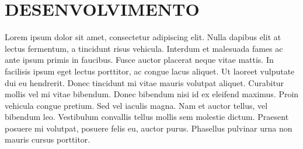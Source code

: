 \chapter{DESENVOLVIMENTO}
\label{chap:desenvolvimento}

Lorem ipsum dolor sit amet, consectetur adipiscing elit. Nulla dapibus elit at lectus fermentum, a tincidunt risus vehicula. Interdum et malesuada fames ac ante ipsum primis in faucibus. Fusce auctor placerat neque vitae mattis. In facilisis ipsum eget lectus porttitor, ac congue lacus aliquet. Ut laoreet vulputate dui eu hendrerit. Donec tincidunt mi vitae mauris volutpat aliquet. Curabitur mollis vel mi vitae bibendum. Donec bibendum nisi id ex eleifend maximus. Proin vehicula congue pretium. Sed vel iaculis magna. Nam et auctor tellus, vel bibendum leo. Vestibulum convallis tellus mollis sem molestie dictum. Praesent posuere mi volutpat, posuere felis eu, auctor purus. Phasellus pulvinar urna non mauris cursus porttitor.